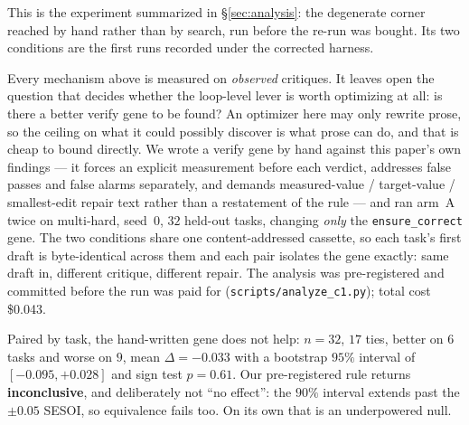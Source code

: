 \documentclass[11pt]{article}
\newcommand{\dd}{\ensuremath{\Delta}}
\begin{document}
This is the experiment summarized in \S\ref{sec:analysis}: the degenerate corner reached by hand rather than by search, run before the re-run was bought. Its two conditions are the first runs recorded under the corrected harness.

\medskip\noindent
Every mechanism above is measured on \emph{observed} critiques. It leaves open the
question that decides whether the loop-level lever is worth optimizing at all: is there a
better verify gene to be found? An optimizer here may only rewrite prose, so the ceiling
on what it could possibly discover is what prose can do, and that is cheap to bound
directly. We wrote a verify gene by hand against this paper's own findings --- it forces an
explicit measurement before each verdict, addresses false passes and false alarms
separately, and demands measured-value / target-value / smallest-edit repair text rather
than a restatement of the rule --- and ran arm~A twice on multi-hard, seed~0, $32$ held-out
tasks, changing \emph{only} the \texttt{ensure\_correct} gene. The two conditions share one
content-addressed cassette, so each task's first draft is byte-identical across them and
each pair isolates the gene exactly: same draft in, different critique, different repair.
The analysis was pre-registered and committed before the run was paid for
(\texttt{scripts/analyze\_c1.py}); total cost \$0.043.

Paired by task, the hand-written gene does not help: $n{=}32$, $17$ ties, better on $6$
tasks and worse on $9$, mean $\dd = -0.033$ with a bootstrap $95\%$ interval of
$[-0.095,+0.028]$ and sign test $p=0.61$. Our pre-registered rule returns
\textbf{inconclusive}, and deliberately not ``no effect'': the $90\%$ interval extends past
the $\pm0.05$ SESOI, so equivalence fails too. On its own that is an underpowered null.
\end{document}
